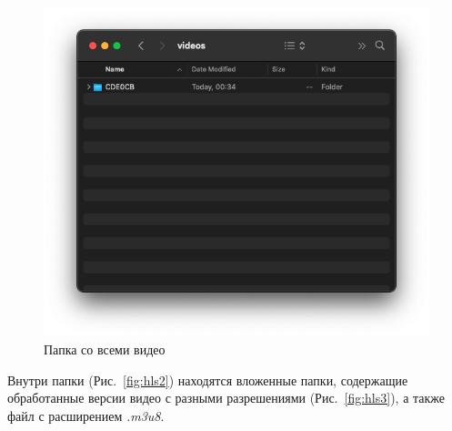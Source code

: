 \documentclass{../../includes/TechDocMultiAuthors}
\begin{document}
    \begin{figure}[H]
        \centering
        \includegraphics[width=0.7\linewidth]{../images/hls1.png}
        \caption{Папка со всеми видео}
        \label{fig:hls1}
    \end{figure}

    Внутри папки (Рис.~\ref{fig:hls2}) находятся вложенные папки, содержащие обработанные версии видео с разными разрешениями (Рис.~\ref{fig:hls3}), а также файл с расширением \emph{.m3u8}.
\end{document}
